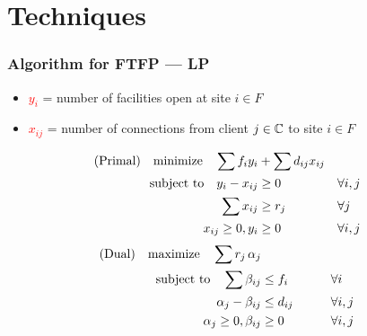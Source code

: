 \documentclass[hyperref,dvipsnames,svgnames,compress]{beamer}
\begin{document}

\section[Techniques]{Techniques}


\begin{frame}
  \frametitle{Algorithm for FTFP --- LP}
  \begin{itemize}
  \item \textcolor{red}{$y_i$} = number of facilities open at site $i\in F$
  \item \textcolor{red}{$x_{ij}$} = number of connections from client $j\in
    \mathbb{C}$ to site $i \in F$
  \end{itemize}
  \begin{alignat*}{3}
    \text{(Primal)} \quad\textrm{minimize}\quad \sum f_iy_i &+ \sum d_{ij}x_{ij}&
    \\ \notag
    \textrm{subject to}\quad y_i - x_{ij} &\geq 0  & &\forall i,j
    \\ \notag
    \sum x_{ij} &\geq r_j & &\forall j
    \\ \notag
    x_{ij} \geq 0, y_i &\geq 0 & &\forall i,j
  \end{alignat*}
  \begin{alignat*}{3}
  \text{(Dual)}\quad  \textrm{maximize}\quad \sum r_j\, \alpha_j&
    \\ \notag
    \textrm{subject to} \quad 
      \sum \beta_{ij} &\leq f_i  &\quad\quad			&\forall i
    \\ \notag
    \alpha_{j} - \beta_{ij} 	&\leq  d_{ij}       &                 & \forall i,j
    \\ \notag
    \alpha_j \geq 0, \beta_{ij} &\geq 0           &            & \forall i,j
  \end{alignat*}
\end{frame}
\end{document}
